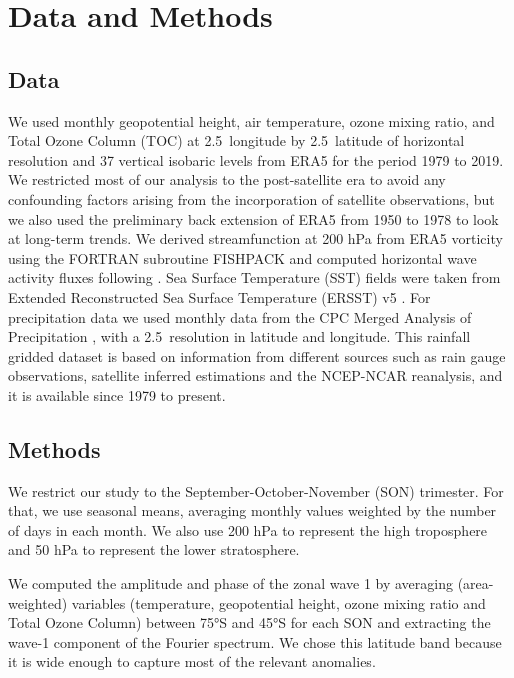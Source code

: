 \documentclass[smallextended]{svjour3}       %
\begin{document}
\hypertarget{data-and-methods}{%
\section{Data and Methods}\label{data-and-methods}}

\hypertarget{data}{%
\subsection{Data}\label{data}}

We used monthly geopotential height, air temperature, ozone mixing ratio, and Total Ozone Column (TOC) at 2.5\degree~longitude by 2.5\degree~latitude of horizontal resolution and 37 vertical isobaric levels from ERA5 \citep{era5} for the period 1979 to 2019. We restricted most of our analysis to the post-satellite era to avoid any confounding factors arising from the incorporation of satellite observations, but we also used the preliminary back extension of ERA5 from 1950 to 1978 \citep{era5be} to look at long-term trends. We derived streamfunction at 200 hPa from ERA5 vorticity using the FORTRAN subroutine FISHPACK \citep{fishpack} and computed horizontal wave activity fluxes following \citet{plumb1985}. Sea Surface Temperature (SST) fields were taken from Extended Reconstructed Sea Surface Temperature (ERSST) v5 \citep{huang2017}. For precipitation data we used monthly data from the CPC Merged Analysis of Precipitation \citep{cmap}, with a 2.5\degree~resolution in latitude and longitude. This rainfall gridded dataset is based on information from different sources such as rain gauge observations, satellite inferred estimations and the NCEP-NCAR reanalysis, and it is available since 1979 to present.

\hypertarget{methods}{%
\subsection{Methods}\label{methods}}

We restrict our study to the September-October-November (SON) trimester. For that, we use seasonal means, averaging monthly values weighted by the number of days in each month. We also use 200 hPa to represent the high troposphere and 50 hPa to represent the lower stratosphere.

We computed the amplitude and phase of the zonal wave 1 by averaging (area-weighted) variables (temperature, geopotential height, ozone mixing ratio and Total Ozone Column) between 75°S and 45°S for each SON and extracting the wave-1 component of the Fourier spectrum. We chose this latitude band because it is wide enough to capture most of the relevant anomalies.
\end{document}
